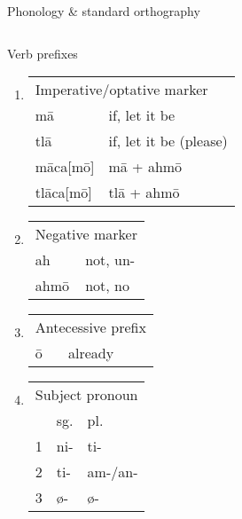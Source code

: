 \documentclass[12pt]{beamer}
\newcommand{\nah}[1]{\textcolor{nahgrn}{#1}}
\newcommand{\trs}[1]{\textcolor{nahblu}{#1}}
\begin{document}
\begin{frame}
\begin{columns}[t]
\begin{column}{.22\linewidth}
\begin{block}{Phonology \& standard orthography}
\begin{threeparttable}
\begin{tablenotes}
\begin{frame}
\begin{frame}
\begin{columns}[t]
\begin{column}{0.18\linewidth}
\begin{block}{Verb prefixes}
\begin{enumerate}
\begin{tabular}[t]{ll}
          \end{tabular}
=======
          \item
                \begin{tabular}[t]{ll}
                  \multicolumn{2}{l}{Imperative/optative marker} \\
                  \nah{mā}        & \trs{if, let it be}          \\
                  \nah{tlā}       & \trs{if, let it be (please)} \\
                  \nah{māca[mō]}  & \nah{mā + ahmō}              \\
                  \nah{tlāca[mō]} & \nah{tlā + ahmō}             \\
                \end{tabular}
          \item
                \begin{tabular}[t]{ll}
                  \multicolumn{2}{l}{Negative marker} \\
                  \nah{ah}   & \trs{not, un-}         \\
                  \nah{ahmō} & \trs{not, no}          \\
                \end{tabular}
          \item
                \begin{tabular}[t]{ll}
                  \multicolumn{2}{l}{Antecessive prefix} \\
                  \nah{ō} & \trs{already}                \\
                \end{tabular}
          \item
                \begin{threeparttable}
                  \begin{tabular}[t]{lll}
                    \multicolumn{3}{l}{Subject pronoun}             \\
                      & sg.                & pl.                    \\
                    1 & \nah{ni-}          & \nah{ti-}              \\
                    2 & \nah{ti-}\tnote{1} & \nah{am-/an-}\tnote{1} \\
                    3 & \nah{ø-}           & \nah{ø-}               \\
                  \end{tabular}
                  \begin{tablenotes}

\end{tablenotes}
\end{threeparttable}
\end{enumerate}
\end{block}
\end{column}
\end{columns}
\end{frame}
\end{frame}
\end{tablenotes}
\end{threeparttable}
\end{block}
\end{column}
\end{columns}
\end{frame}
\end{document}
